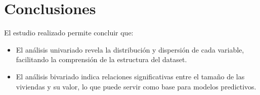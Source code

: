 \documentclass[a4paper, 10pt]{article}
\begin{document}
\section{Conclusiones}\label{s:6}
El estudio realizado permite concluir que:
\begin{itemize}
    \item El análisis univariado revela la distribución y dispersión de cada variable, facilitando la comprensión de la estructura del dataset.
    \item El análisis bivariado indica relaciones significativas entre el tamaño de las viviendas y su valor, lo que puede servir como base para modelos predictivos.
\end{itemize}
\end{document}
